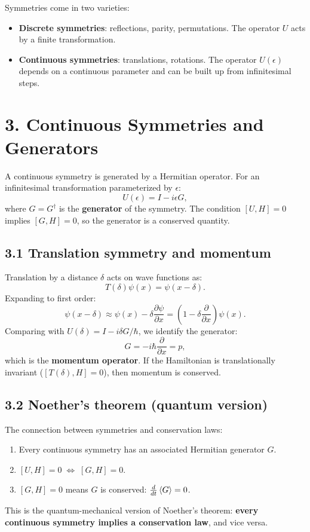 \documentclass[12pt,a4paper]{article}
\begin{document}
Symmetries come in two varieties:
\begin{itemize}[nosep]
    \item \textbf{Discrete symmetries}: reflections, parity, permutations.  The operator $U$ acts by a finite transformation.
    \item \textbf{Continuous symmetries}: translations, rotations.  The operator $U(\epsilon)$ depends on a continuous parameter and can be built up from infinitesimal steps.
\end{itemize}

\section{3. Continuous Symmetries and Generators}

A continuous symmetry is generated by a Hermitian operator.  For an infinitesimal transformation parameterized by $\epsilon$:
\[
    U(\epsilon) = I - i\epsilon G,
\]
where $G = G^\dagger$ is the \textbf{generator} of the symmetry.  The condition $[U, H] = 0$ implies $[G, H] = 0$, so the generator is a conserved quantity.

\subsection{3.1 Translation symmetry and momentum}

Translation by a distance $\delta$ acts on wave functions as:
\[
    T(\delta)\psi(x) = \psi(x - \delta).
\]
Expanding to first order:
\[
    \psi(x - \delta) \approx \psi(x) - \delta \frac{\partial \psi}{\partial x} = \left(1 - \delta \frac{\partial}{\partial x}\right)\psi(x).
\]
Comparing with $U(\delta) = I - i\delta G/\hbar$, we identify the generator:
\[
    G = -i\hbar\frac{\partial}{\partial x} = p,
\]
which is the \textbf{momentum operator}.  If the Hamiltonian is translationally invariant ($[T(\delta), H] = 0$), then momentum is conserved.

\subsection{3.2 Noether's theorem (quantum version)}

The connection between symmetries and conservation laws:
\begin{enumerate}[nosep]
    \item Every continuous symmetry has an associated Hermitian generator $G$.
    \item $[U, H] = 0 \;\Longleftrightarrow\; [G, H] = 0$.
    \item $[G, H] = 0$ means $G$ is conserved: $\frac{d}{dt}\expval{G} = 0$.
\end{enumerate}
This is the quantum-mechanical version of Noether's theorem: \textbf{every continuous symmetry implies a conservation law}, and vice versa.
\end{document}
